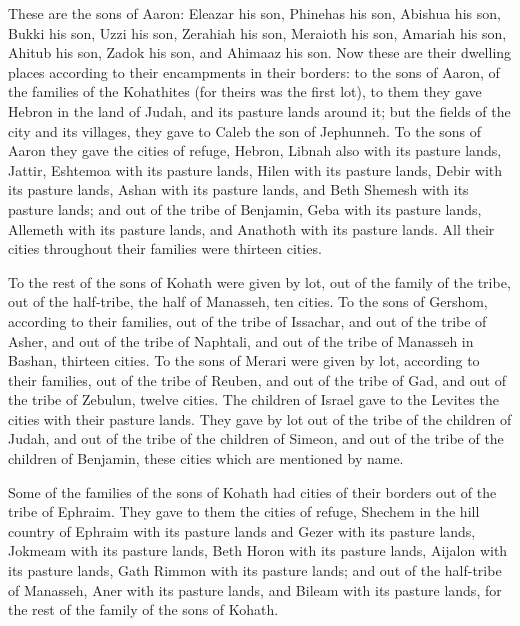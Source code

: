  These are the sons of Aaron: Eleazar his son, Phinehas his
son, Abishua his son,  Bukki his son, Uzzi his son,
Zerahiah his son,  Meraioth his son, Amariah his son,
Ahitub his son,  Zadok his son, and Ahimaaz his son.
 Now these are their dwelling places according to their
encampments in their borders: to the sons of Aaron, of the families of
the Kohathites (for theirs was the first lot),  to them
they gave Hebron in the land of Judah, and its pasture lands around it;
 but the fields of the city and its villages, they gave to
Caleb the son of Jephunneh.  To the sons of Aaron they gave
the cities of refuge, Hebron, Libnah also with its pasture lands,
Jattir, Eshtemoa with its pasture lands,  Hilen with its
pasture lands, Debir with its pasture lands,  Ashan with
its pasture lands, and Beth Shemesh with its pasture lands;
 and out of the tribe of Benjamin, Geba with its pasture
lands, Allemeth with its pasture lands, and Anathoth with its pasture
lands. All their cities throughout their families were thirteen cities.

 To the rest of the sons of Kohath were given by lot, out
of the family of the tribe, out of the half-tribe, the half of Manasseh,
ten cities.  To the sons of Gershom, according to their
families, out of the tribe of Issachar, and out of the tribe of Asher,
and out of the tribe of Naphtali, and out of the tribe of Manasseh in
Bashan, thirteen cities.  To the sons of Merari were given
by lot, according to their families, out of the tribe of Reuben, and out
of the tribe of Gad, and out of the tribe of Zebulun, twelve cities.
 The children of Israel gave to the Levites the cities with
their pasture lands.  They gave by lot out of the tribe of
the children of Judah, and out of the tribe of the children of Simeon,
and out of the tribe of the children of Benjamin, these cities which are
mentioned by name.

 Some of the families of the sons of Kohath had cities of
their borders out of the tribe of Ephraim.  They gave to
them the cities of refuge, Shechem in the hill country of Ephraim with
its pasture lands and Gezer with its pasture lands, 
Jokmeam with its pasture lands, Beth Horon with its pasture lands,
 Aijalon with its pasture lands, Gath Rimmon with its
pasture lands;  and out of the half-tribe of Manasseh, Aner
with its pasture lands, and Bileam with its pasture lands, for the rest
of the family of the sons of Kohath.

